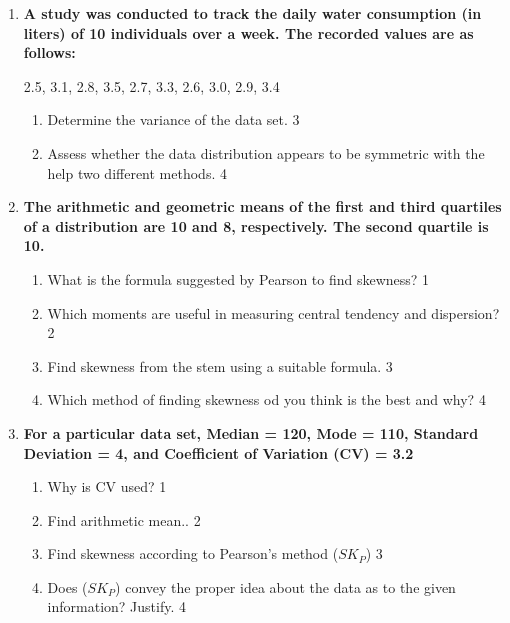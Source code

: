 \documentclass[a4paper,oneside]{book}
\begin{document}
\begin{enumerate}
  \item
\textbf{A study was conducted to track the daily water consumption (in liters) 
of 10 individuals over a week. The recorded values are as follows:}

\begin{center}
2.5, 3.1, 2.8, 3.5, 2.7, 3.3, 2.6, 3.0, 2.9, 3.4
\end{center}

\begin{enumerate}
\item
Determine the variance of the data set. \hfill 3
\item
Assess whether the data distribution appears to be symmetric with the help
two different methods. \hfill 4
\end{enumerate}

  
   \item
	  \textbf{The arithmetic and geometric means of the first and third 
	  quartiles of a distribution are 10 and 8, respectively. The 
	  second quartile is 10.} 
  
  \begin{enumerate}
    \item
	What is the formula suggested by Pearson to find skewness? \hfill 1
    \item
	Which moments are useful in measuring central tendency and dispersion?  \hfill 2
    \item  
	Find skewness from the stem using a suitable formula. \hfill 3
    \item
	Which method of finding skewness od you think is the best and why? \hfill 4
\end{enumerate}

 \item
	  \textbf{For a particular data set, Median = 120, Mode = 110, Standard Deviation = 4, and Coefficient of Variation (CV)  = 3.2} 
  
  \begin{enumerate}
    \item
	Why is  CV used?  \hfill 1
    \item
	Find arithmetic mean.. \hfill 2
    \item  
	Find skewness according to Pearson's method ($SK_P$) \hfill 3
    \item
	Does ($SK_P$) convey the proper idea about the data as to the given information? Justify. \hfill 4
  \end{enumerate}
  \end{enumerate}
\end{document}
